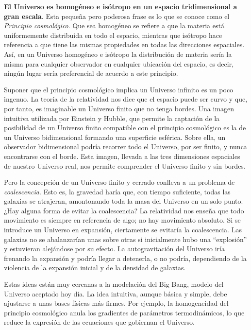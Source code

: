 \documentclass[a4paper,openright,12pt]{book}
\begin{document}
\textbf{El Universo es homogéneo e isótropo en un espacio tridimensional a gran escala}. Esta pequeña pero poderosa frase es lo que se conoce como el \textit{Principio cosmológico}. Que sea homogéneo se refiere a que la materia está uniformemente distribuida en todo el espacio, mientras que isótropo hace referencia a que tiene las mismas propiedades en todas las direcciones espaciales. Así, en un Universo homogéneo e isótropo la distribución de materia sería la misma para cualquier observador en cualquier ubicación del espacio, es decir, ningún lugar sería preferencial de acuerdo a este principio.

Suponer que el principio cosmológico implica un Universo infinito es un poco ingenuo. La teoría de la relatividad nos dice que el espacio puede ser curvo y que, por tanto, es imaginable un Universo finito que no tenga bordes. Una imagen intuitiva utilizada por Einstein y Hubble, que permite la captación de la posibilidad de un Universo finito compatible con el principio cosmológico es la de un Universo bidimensional formando una superficie esférica. Sobre ella, un observador bidimensional podría recorrer todo el Universo, por ser finito, y nunca encontrarse con el borde. Esta imagen, llevada a las tres dimensiones espaciales de nuestro Universo real, nos permite comprender el Universo finito y sin bordes.

Pero la concepción de un Universo finito y cerrado conlleva a un problema de \textit{coalescencia}. Esto es, la gravedad haría que, con tiempo suficiente, todas las galaxias se atrajeran, amontonando toda la masa del Universo en un solo punto. ¿Hay alguna forma de evitar la coalescencia? La relatividad nos enseña que todo movimiento es siempre en referencia de algo; no hay movimiento absoluto. Si se introduce un Universo en expansión, ciertamente se evitaría la coalescencia. Las galaxias no se abalanzarían unas sobre otras si inicialmente hubo una ``explosión'' y estuvieran alejándose por su efecto. La autogravitación del Universo iría frenando la expansión y podría llegar a detenerla, o no podría, dependiendo de la violencia de la expansión inicial y de la densidad de galaxias.

Estas ideas están muy cercanas a la modelación del Big Bang, modelo del Universo aceptado hoy día. La idea intuitiva, aunque básica y simple, debe ajustarse a unas bases físicas más firmes. Por ejemplo, la homogeneidad del principio cosmológico anula los gradientes de parámetros termodinámicos, lo que reduce la expresión de las ecuaciones que gobiernan el Universo.
\end{document}
